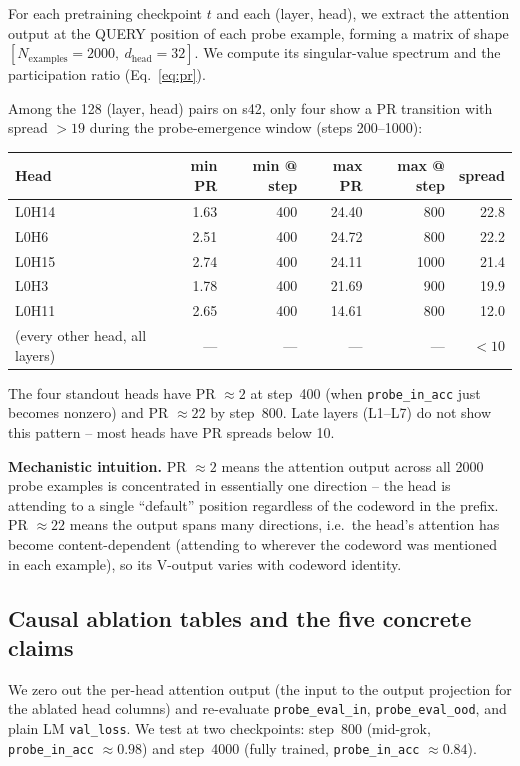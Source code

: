 \documentclass[11pt]{article}
\begin{document}
For each pretraining checkpoint $t$ and each (layer, head), we extract the attention output at the QUERY position of each probe example, forming a matrix of shape $[N_{\mathrm{examples}}{=}2000,\ d_{\mathrm{head}}{=}32]$. We compute its singular-value spectrum and the participation ratio (Eq.~\ref{eq:pr}).

Among the 128 (layer, head) pairs on s42, only four show a PR transition with spread $>19$ during the probe-emergence window (steps 200--1000):

\begin{center}
\small
\begin{tabular}{lrrrrr}
\toprule
Head & min PR & min @ step & max PR & max @ step & spread \\
\midrule
L0H14 & 1.63 & 400 & 24.40 & 800 & 22.8 \\
L0H6  & 2.51 & 400 & 24.72 & 800 & 22.2 \\
L0H15 & 2.74 & 400 & 24.11 & 1000 & 21.4 \\
L0H3  & 1.78 & 400 & 21.69 & 900 & 19.9 \\
L0H11 & 2.65 & 400 & 14.61 & 800 & 12.0 \\
(every other head, all layers) & --- & --- & --- & --- & $<10$ \\
\bottomrule
\end{tabular}
\end{center}

The four standout heads have PR $\approx 2$ at step~400 (when \texttt{probe\_in\_acc} just becomes nonzero) and PR $\approx 22$ by step~800. Late layers (L1--L7) do not show this pattern -- most heads have PR spreads below 10.

\textbf{Mechanistic intuition.} PR $\approx 2$ means the attention output across all 2000 probe examples is concentrated in essentially one direction -- the head is attending to a single ``default'' position regardless of the codeword in the prefix. PR $\approx 22$ means the output spans many directions, i.e.\ the head's attention has become content-dependent (attending to wherever the codeword was mentioned in each example), so its V-output varies with codeword identity.

\subsection{Causal ablation tables and the five concrete claims}
\label{sec:s42_ablation}

We zero out the per-head attention output (the input to the output projection for the ablated head columns) and re-evaluate \texttt{probe\_eval\_in}, \texttt{probe\_eval\_ood}, and plain LM \texttt{val\_loss}. We test at two checkpoints: step~800 (mid-grok, \texttt{probe\_in\_acc} $\approx 0.98$) and step~4000 (fully trained, \texttt{probe\_in\_acc} $\approx 0.84$).
\end{document}
